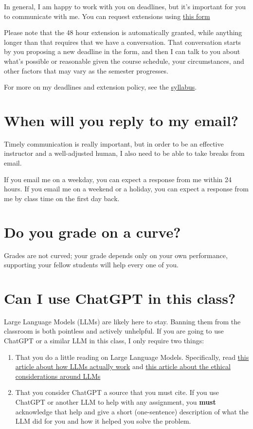 \documentclass[
  letterpaper,
  DIV=11,
  numbers=noendperiod]{scrartcl}
\begin{document}
In general, I am happy to work with you on deadlines, but it's important
for you to communicate with me. You can request extensions using
\href{https://forms.gle/eFx7y7FoSdoukKGC6}{this form}

Please note that the 48 hour extension is automatically granted, while
anything longer than that requires that we have a conversation. That
conversation starts by you proposing a new deadline in the form, and
then I can talk to you about what's possible or reasonable given the
course schedule, your circumstances, and other factors that may vary as
the semester progresses.

For more on my deadlines and extension policy, see the
\href{syllabus.qmd\#deadlines}{syllabus}.

\section{When will you reply to my email?}\label{emails}

Timely communication is really important, but in order to be an
effective instructor and a well-adjusted human, I also need to be able
to take breaks from email.

If you email me on a weekday, you can expect a response from me within
24 hours. If you email me on a weekend or a holiday, you can expect a
response from me by class time on the first day back.

\section{Do you grade on a curve?}\label{gradingcurve}

Grades are not curved; your grade depends only on your own performance,
supporting your fellow students will help every one of you.

\section{Can I use ChatGPT in this class?}\label{ChatGPT}

Large Language Models (LLMs) are likely here to stay. Banning them from
the classroom is both pointless and actively unhelpful. If you are going
to use ChatGPT or a similar LLM in this class, I only require two
things:

\begin{enumerate}
\def\labelenumi{\arabic{enumi}.}
\item
  That you do a little reading on Large Language Models. Specifically,
  read
  \href{https://stackoverflow.blog/2023/07/03/do-large-language-models-know-what-they-are-talking-about/}{this
  article about how LLMs actually work} and
  \href{https://montrealethics.ai/what-lies-behind-agi-ethical-concerns-related-to-llms/}{this
  article about the ethical considerations around LLMs}
\item
  That you consider ChatGPT a source that you must cite. If you use
  ChatGPT or another LLM to help with any assignment, you \textbf{must}
  acknowledge that help and give a short (one-sentence) description of
  what the LLM did for you and how it helped you solve the problem.
\end{enumerate}
\end{document}
